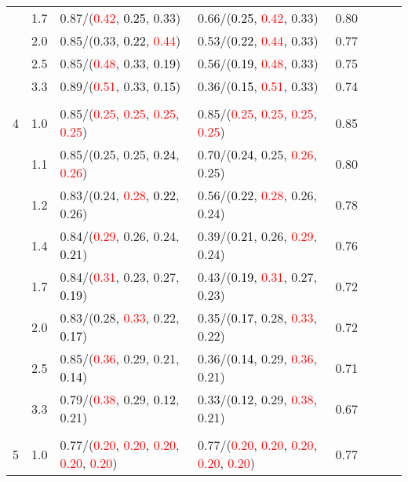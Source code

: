 \documentclass[10pt,a4paper]{report}
\begin{document}
\begin{table}[!htbp]
\begin{center}
{\begin{tabular}{ccllcccc}
			&1.7&0.87/(\textcolor{red}{0.42}, \textcolor{black}{0.25}, 0.33)&0.66/(\textcolor{black}{0.25}, \textcolor{red}{0.42}, 0.33)&0.80\\
			&2.0&0.85/(0.33, \textcolor{black}{0.22}, \textcolor{red}{0.44})&0.53/(\textcolor{black}{0.22}, \textcolor{red}{0.44}, 0.33)&0.77\\
			&2.5&0.85/(\textcolor{red}{0.48}, 0.33, \textcolor{black}{0.19})&0.56/(\textcolor{black}{0.19}, \textcolor{red}{0.48}, 0.33)&0.75\\
			&3.3&0.89/(\textcolor{red}{0.51}, 0.33, \textcolor{black}{0.15})&0.36/(\textcolor{black}{0.15}, \textcolor{red}{0.51}, 0.33)&0.74\\
			&&&&\\
			4			&1.0&0.85/(\textcolor{red}{0.25}, \textcolor{red}{0.25}, \textcolor{red}{0.25}, \textcolor{red}{0.25})&0.85/(\textcolor{red}{0.25}, \textcolor{red}{0.25}, \textcolor{red}{0.25}, \textcolor{red}{0.25})&0.85\\
			&1.1&0.85/(0.25, 0.25, \textcolor{black}{0.24}, \textcolor{red}{0.26})&0.70/(\textcolor{black}{0.24}, 0.25, \textcolor{red}{0.26}, 0.25)&0.80\\
			&1.2&0.83/(0.24, \textcolor{red}{0.28}, \textcolor{black}{0.22}, 0.26)&0.56/(\textcolor{black}{0.22}, \textcolor{red}{0.28}, 0.26, 0.24)&0.78\\
			&1.4&0.84/(\textcolor{red}{0.29}, 0.26, 0.24, \textcolor{black}{0.21})&0.39/(\textcolor{black}{0.21}, 0.26, \textcolor{red}{0.29}, 0.24)&0.76\\
			&1.7&0.84/(\textcolor{red}{0.31}, 0.23, 0.27, \textcolor{black}{0.19})&0.43/(\textcolor{black}{0.19}, \textcolor{red}{0.31}, 0.27, 0.23)&0.72\\
			&2.0&0.83/(0.28, \textcolor{red}{0.33}, 0.22, \textcolor{black}{0.17})&0.35/(\textcolor{black}{0.17}, 0.28, \textcolor{red}{0.33}, 0.22)&0.72\\
			&2.5&0.85/(\textcolor{red}{0.36}, 0.29, 0.21, \textcolor{black}{0.14})&0.36/(\textcolor{black}{0.14}, 0.29, \textcolor{red}{0.36}, 0.21)&0.71\\
			&3.3&0.79/(\textcolor{red}{0.38}, 0.29, \textcolor{black}{0.12}, 0.21)&0.33/(\textcolor{black}{0.12}, 0.29, \textcolor{red}{0.38}, 0.21)&0.67\\
			&&&&\\
			5			&1.0&0.77/(\textcolor{red}{0.20}, \textcolor{red}{0.20}, \textcolor{red}{0.20}, \textcolor{red}{0.20}, \textcolor{red}{0.20})&0.77/(\textcolor{red}{0.20}, \textcolor{red}{0.20}, \textcolor{red}{0.20}, \textcolor{red}{0.20}, \textcolor{red}{0.20})&0.77\\

\end{tabular}}
\end{center}
\end{table}
\end{document}

